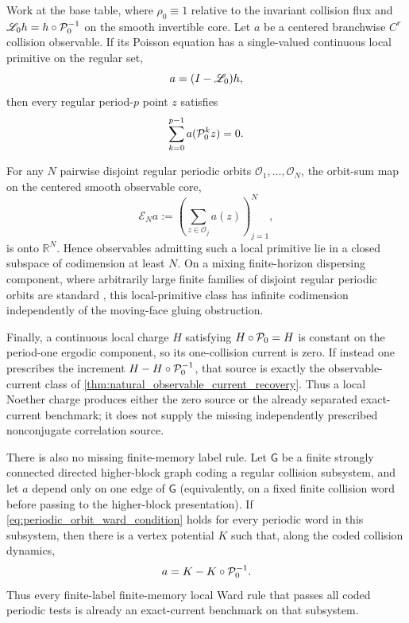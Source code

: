 \begin{proposition}
\label{prop:periodic_orbit_rigidity_local_ward_primitive}
Work at the base table, where \(\rho_0\equiv1\) relative to the invariant
collision flux and
\(\mathscr L_0h=h\circ\mathcal P_0^{-1}\) on the smooth invertible core.  Let
\(a\) be a centered branchwise \(C^r\) collision observable.  If its Poisson
equation has a single-valued continuous local primitive on the regular set,
\begin{equation}
\label{eq:local_ward_primitive_equation}
 a=(I-\mathscr L_0)h,
\end{equation}
then every regular period-\(p\) point \(z\) satisfies
\begin{equation}
\label{eq:periodic_orbit_ward_condition}
 \sum_{k=0}^{p-1}a(\mathcal P_0^kz)=0.
\end{equation}

For any \(N\) pairwise disjoint regular periodic orbits
\(\mathcal O_1,\ldots,\mathcal O_N\), the orbit-sum map on the centered smooth
observable core,
\begin{equation}
\label{eq:periodic_orbit_evaluation_map}
 \mathcal E_Na
 :=\left(\sum_{z\in\mathcal O_j}a(z)\right)_{j=1}^N,
\end{equation}
is onto \(\mathbb R^N\).  Hence observables admitting such a local primitive
lie in a closed subspace of codimension at least \(N\).  On a mixing
finite-horizon dispersing component, where arbitrarily large finite families
of disjoint regular periodic orbits are standard
\cite{Sinai1970,chernov2006chaotic}, this local-primitive class
has infinite codimension independently of the moving-face gluing obstruction.

Finally, a continuous local charge \(H\) satisfying
\(H\circ\mathcal P_0=H\) is constant on the period-one ergodic component, so its
one-collision current is zero.  If instead one prescribes the increment
\(H-H\circ\mathcal P_0^{-1}\), that source is exactly the observable-current class
of \cref{thm:natural_observable_current_recovery}.  Thus a local Noether charge
produces either the zero source or the already separated exact-current
benchmark; it does not supply the missing independently prescribed
nonconjugate correlation source.

There is also no missing finite-memory label rule.  Let \(\mathsf G\) be a
finite strongly connected directed higher-block graph coding a regular
collision subsystem, and let \(a\) depend only on one edge of \(\mathsf G\)
(equivalently, on a fixed finite collision word before passing to the
higher-block presentation).  If \eqref{eq:periodic_orbit_ward_condition}
holds for every periodic word in this subsystem, then there is a vertex
potential \(K\) such that, along the coded collision dynamics,
\begin{equation}
\label{eq:finite_memory_label_coboundary}
 a=K-K\circ\mathcal P_0^{-1}.
\end{equation}
Thus every finite-label finite-memory local Ward rule that passes all coded
periodic tests is already an exact-current benchmark on that subsystem.
\end{proposition}

